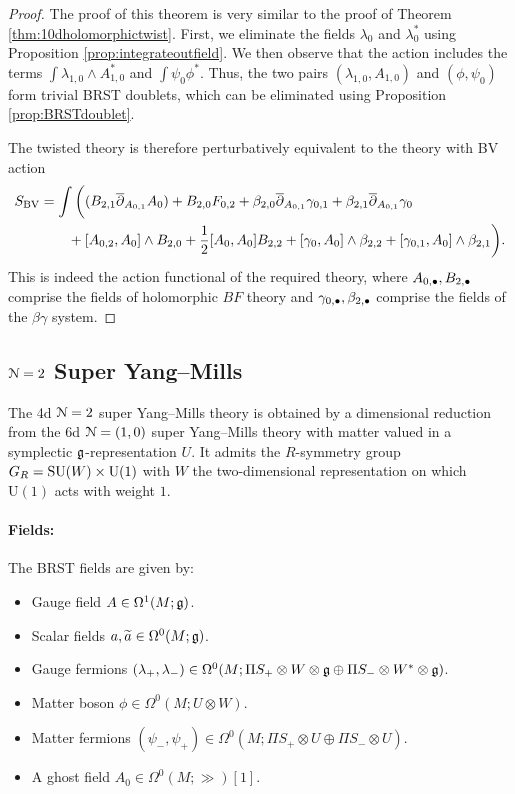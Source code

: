 \documentclass[10pt, oneside]{article}
\renewcommand{\U}{\mathrm{U}}
\begin{document}
\begin{proof}
The proof of this theorem is very similar to the proof of Theorem \ref{thm:10dholomorphictwist}.  
First, we eliminate the fields $\lambda_0$ and $\lambda_0^*$ using Proposition \ref{prop:integrateoutfield}.  
We then observe that the action includes the terms $\int \lambda_{1,0} \wedge A_{1,0}^*$ and  $\int \psi_0\phi^*$. Thus, the two pairs $(\lambda_{1,0}, A_{1,0})$ and $(\phi, \psi_0)$ form trivial BRST doublets, which can be eliminated using Proposition \ref{prop:BRSTdoublet}.

The twisted theory is therefore perturbatively equivalent to the theory with BV action 
\begin{align*}
 S_{\mathrm{BV}} &= \int \bigg( (B_{2,1} \overline{\partial}_{A_{0,1}} A_{0})  + B_{2,0} F_{0,2} + \beta_{2,0} \overline{\partial}_{A_{0,1}} \gamma_{0,1} + \beta_{2,1} \overline{\partial}_{A_{0,1}} \gamma_0 \\ 
  &\qquad  + [A_{0,2}, A_0]\wedge B_{2,0} + \frac{1}{2}[A_0, A_0]B_{2,2} +  [\gamma_0, A_0]\wedge \beta_{2,2} + [\gamma_{0,1}, A_0]\wedge \beta_{2,1}  \bigg).
\end{align*}
This is indeed the action functional of the required theory, where $A_{0,\bullet}, B_{2,\bullet}$ comprise the fields of holomorphic $BF$ theory and $\gamma_{0,\bullet}, \beta_{2,\bullet}$ comprise the fields of the $\beta\gamma$ system.
\end{proof}

\subsection{\texorpdfstring{$\mathcal N=2$}{N=2} Super Yang--Mills} \label{4d_2_section}

The 4d $\mathcal N=2$ super Yang--Mills theory is obtained by a dimensional reduction from the 6d $\mathcal N=(1, 0)$ super Yang--Mills theory with matter valued in a symplectic $\mathfrak g$-representation $U$. It admits the $R$-symmetry group $G_R=\SU(W)\times \U(1)$ with $W$ the two-dimensional representation on which $\U(1)$ acts with weight $1$.

\vspace{-10pt}
\paragraph{Fields:} The BRST fields are given by:
\begin{itemize}
\item Gauge field $A \in \Omega^1(M; \mathfrak g)$.
\item Scalar fields $a, \widetilde{a}\in\Omega^0(M;\mathfrak g)$.
\item Gauge fermions $(\lambda_+, \lambda_-) \in \Omega^0(M; \Pi S_+ \otimes W\otimes \mathfrak g \oplus \Pi S_- \otimes W^*\otimes \mathfrak g)$.
\item Matter boson $\phi\in\Omega^0(M; U\otimes W)$.
\item Matter fermions $(\psi_-, \psi_+)\in\Omega^0(M; \Pi S_+\otimes U\oplus \Pi S_-\otimes U)$.
\item A ghost field $A_0\in \Omega^0(M; \gg)[1]$.
\end{itemize}
\end{document}
